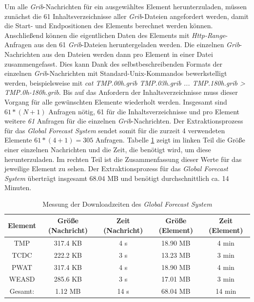 Um alle \textit{Grib}-Nachrichten für ein ausgewähltes Element
herunterzuladen, müssen zunächst die 61 Inhaltsverzeichnisse aller
\textit{Grib}-Dateien angefordert werden, damit die Start- und
Endpositionen des Elements berechnet werden können. Anschließend
können die eigentlichen Daten des Elements mit
\textit{Http-Range}-Anfragen aus den 61 \textit{Grib}-Dateien
heruntergeladen werden. Die einzelnen \textit{Grib}-Nachrichten aus
den Dateien werden dann pro Element in einer Datei
zusammengefasst. Dies kann Dank des selbstbeschreibenden Formats der
einzelnen \textit{Grib}-Nachrichten mit Standard-Unix-Kommandos
bewerkstelligt werden, beispielsweise mit \textit{cat TMP.00h.grib
  TMP.03h.grib ... TMP.180h.grib > TMP.0h-180h.grib}. Bis auf das
Anfordern der Inhaltsverzeichnisse muss dieser Vorgang für alle
gewünschten Elemente wiederholt werden. Insgesamt sind $ 61 * (N+1) $
Anfragen nötig, 61 für die Inhaltsverzeichnisse und pro Element
weitere \textit{61} Anfragen für die einzelnen
\textit{Grib}-Nachrichten. Der Extraktionsprozess für das
\textit{Global Forecast System} sendet somit für die zurzeit 4
verwendeten Elemente $ 61 * (4+1) = 305$ Anfragen. Tabelle
\ref{tab:download_messung_gfs} zeigt im linken Teil die Größe einer
einzelnen Nachrichten und die Zeit, die benötigt wird, um diese
herunterzuladen. Im rechten Teil ist die Zusammenfassung dieser Werte
für das jeweilige Element zu sehen. Der Extraktionsprozess für das
\textit{Global Forecast System} überträgt insgesamt 68.04 MB und
benötigt durchschnittlich ca. 14 Minuten.

\begin{table}[h]
  \centering
  {\sf
    \footnotesize
    \begin{longtable}{@{}ccccc}
      \toprule
      \textbf{Element} & \textbf{Größe (Nachricht)} & \textbf{Zeit (Nachricht)} & \textbf{Größe (Element)} & \textbf{Zeit (Element)} \\
      \midrule
      TMP   & 317.4 KB & 4 s & 18.90 MB & 4 min \\
      TCDC  & 222.2 KB & 3 s & 13.23 MB & 3 min \\
      PWAT  & 317.4 KB & 4 s & 18.90 MB & 4 min \\
      WEASD & 285.6 KB & 3 s & 17.01 MB & 3 min \\
      \midrule
      Gesamt: & 1.12 MB  & 14 s & 68.04 MB & 14 min \\
      \bottomrule
    \end{longtable}
  }
  \caption{Messung der Downloadzeiten des \textit{Global Forecast System}}
  \label{tab:download_messung_gfs}
\end{table}

